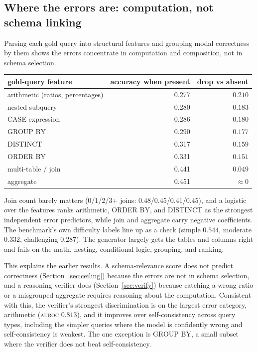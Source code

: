 \documentclass[11pt]{article}
\newcommand{\auroc}{\textsc{auroc}}
\begin{document}
\subsection{Where the errors are: computation, not schema linking}
\label{sec:errors}
Parsing each gold query into structural features and grouping modal correctness by them shows the
errors concentrate in computation and composition, not in schema selection.
\begin{table}[h]\centering
\begin{tabular}{lrr}
\toprule
gold-query feature & accuracy when present & drop vs absent \\
\midrule
arithmetic (ratios, percentages) & 0.277 & $0.210$ \\
nested subquery & 0.280 & $0.183$ \\
CASE expression & 0.286 & $0.180$ \\
GROUP BY & 0.290 & $0.177$ \\
DISTINCT & 0.317 & $0.159$ \\
ORDER BY & 0.331 & $0.151$ \\
multi-table / join & 0.441 & $0.049$ \\
aggregate & 0.451 & $\approx 0$ \\
\bottomrule
\end{tabular}
\end{table}

Join count barely matters (0/1/2/3+ joins: $0.48$/$0.45$/$0.41$/$0.45$), and a logistic over the
features ranks arithmetic, ORDER BY, and DISTINCT as the strongest independent error predictors,
while join and aggregate carry negative coefficients. The benchmark's own difficulty labels line up
as a check (simple $0.544$, moderate $0.332$, challenging $0.287$). The generator largely gets the
tables and columns right and fails on the math, nesting, conditional logic, grouping, and ranking.

This explains the earlier results. A schema-relevance score does not predict correctness
(Section~\ref{sec:ceiling}) because the errors are not in schema selection, and a reasoning verifier
does (Section~\ref{sec:verify}) because catching a wrong ratio or a misgrouped aggregate requires
reasoning about the computation. Consistent with this, the verifier's strongest discrimination is on
the largest error category, arithmetic (\auroc{} $0.813$), and it improves over self-consistency
across query types, including the simpler queries where the model is confidently wrong and
self-consistency is weakest. The one exception is GROUP BY, a small subset where the verifier does not
beat self-consistency.
\end{document}
